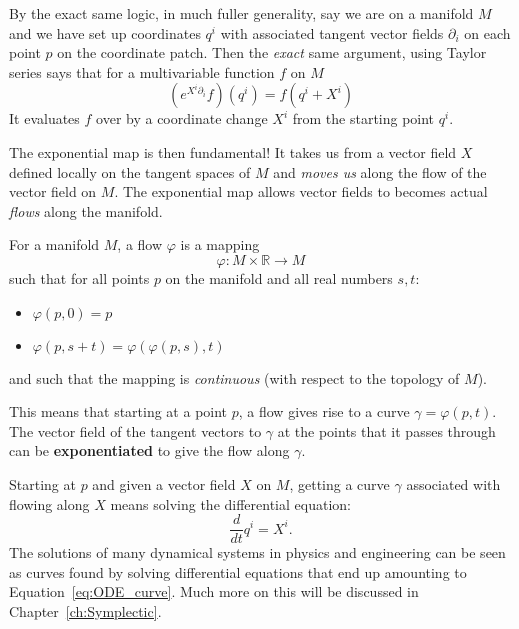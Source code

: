 \documentclass[../master.tex]{subfiles}
\begin{document}
		By the exact same logic, in much fuller generality, say we are on a manifold $M$ and we have set up coordinates $q^i$ with associated tangent vector fields $\partial_i$ on each point $p$ on the coordinate patch. Then the \emph{exact} same argument, using Taylor series says that for a multivariable function $f$ on $M$
		\begin{equation}
			(e^{X^i \partial_i} f)(q^i) = f(q^i + X^i)
		\end{equation}
		It evaluates $f$ over by a coordinate change $X^i$ from the starting point $q^i$.
		
		The exponential map is then fundamental! It takes us from a vector field $X$ defined locally on the tangent spaces of $M$ and \emph{moves us} along the flow of the vector field on $M$. The exponential map allows vector fields to becomes actual \emph{flows} along the manifold. 
		\begin{defn}
			For a manifold $M$, a flow $\varphi$ is a mapping
			\begin{equation}
				\varphi: M \times \mathbb R \rightarrow M
			\end{equation}
			such that for all points $p$ on the manifold and all real numbers $s,t$:
			\begin{itemize}
				\item $\varphi(p,0) = p$
				\item $\varphi(p,s+t) = \varphi(\varphi(p,s),t)$
			\end{itemize}
			and such that the mapping is \emph{continuous} (with respect to the topology of $M$).
		\end{defn}
		This means that starting at a point $p$, a flow gives rise to a curve $\gamma = \varphi(p,t)$. The vector field of the tangent vectors to $\gamma$ at the points that it passes through can be \textbf{exponentiated} to give the flow along $\gamma$.
		
		Starting at $p$ and given a vector field $X$ on $M$, getting a curve $\gamma$ associated with flowing along $X$ means solving the differential equation:
		\begin{equation}\label{eq:ODE_curve}
			\frac{d}{dt} q^i = X^i.
		\end{equation}
		The solutions of many dynamical systems in physics and engineering can be seen as curves found by solving differential equations that end up amounting to  Equation~\eqref{eq:ODE_curve}. Much more on this will be discussed in Chapter~\ref{ch:Symplectic}. 
		
\end{document}
